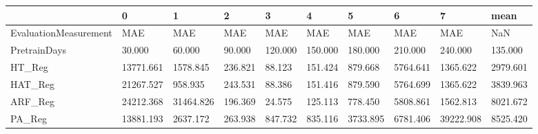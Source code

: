 \begin{tabular}{llllllllll}
\toprule
{} &         0 &         1 &       2 &       3 &       4 &        5 &        6 &         7 &     mean \\
\midrule
EvaluationMeasurement &       MAE &       MAE &     MAE &     MAE &     MAE &      MAE &      MAE &       MAE &      NaN \\
PretrainDays          &    30.000 &    60.000 &  90.000 & 120.000 & 150.000 &  180.000 &  210.000 &   240.000 &  135.000 \\
HT\_Reg                & 13771.661 &  1578.845 & 236.821 &  88.123 & 151.424 &  879.668 & 5764.641 &  1365.622 & 2979.601 \\
HAT\_Reg               & 21267.527 &   958.935 & 243.531 &  88.386 & 151.416 &  879.590 & 5764.699 &  1365.622 & 3839.963 \\
ARF\_Reg               & 24212.368 & 31464.826 & 196.369 &  24.575 & 125.113 &  778.450 & 5808.861 &  1562.813 & 8021.672 \\
PA\_Reg                & 13881.193 &  2637.172 & 263.938 & 847.732 & 835.116 & 3733.895 & 6781.406 & 39222.908 & 8525.420 \\
\bottomrule
\end{tabular}

